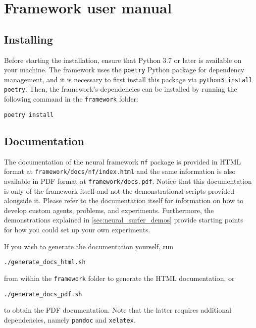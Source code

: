 \chapter{Framework user manual}

\section{Installing}
Before starting the installation, ensure that Python 3.7 or later is available on your machine. 
The framework uses the \texttt{poetry} Python package for dependency management, and it is necessary to first install this package via \texttt{python3 install poetry}. 
Then, the framework's dependencies can be installed by running the following command in the \texttt{framework} folder:
\begin{verbatim}
poetry install
\end{verbatim}

\section{Documentation}
The documentation of the neural framework \texttt{nf} package is provided in HTML format at \texttt{framework/docs/nf/index.html} and the same information is also available in PDF format at \texttt{framework/docs.pdf}.
Notice that this documentation is only of the framework itself and not the demonstrational scripts provided alongside it.
Please refer to the documentation itself for information on how to develop custom agents, problems, and experiments. 
Furthermore, the demonstrations explained in \ref{sec:neural_surfer_demos} provide starting points for how you could set up your own experiments.

If you wish to generate the documentation yourself, run
\begin{verbatim}
./generate_docs_html.sh
\end{verbatim}
from within the \texttt{framework} folder to generate the HTML documentation, or
\begin{verbatim}
./generate_docs_pdf.sh
\end{verbatim}
to obtain the PDF documentation. 
Note that the latter requires additional dependencies, namely \texttt{pandoc} and \texttt{xelatex}.

